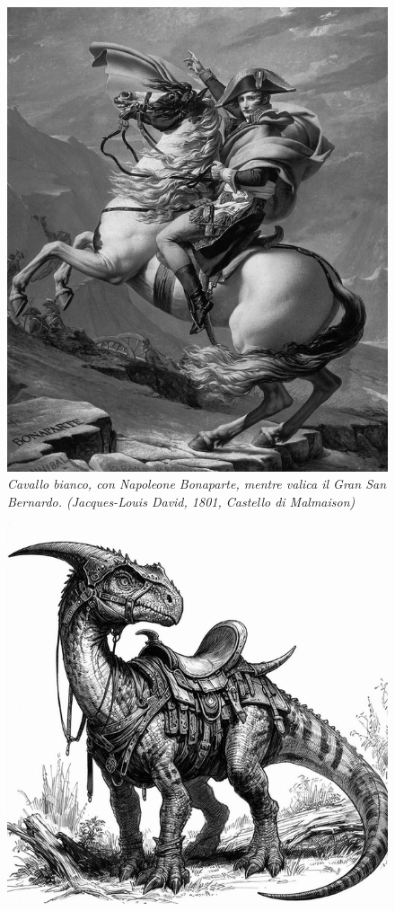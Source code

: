 \begin{figure}[h]
		\centering
	\begin{minipage}{0.45\textwidth}
		\centering
		\includegraphics[width=\textwidth]{immagini/napoleone.png}  %
\emph{Cavallo bianco, con Napoleone Bonaparte, mentre valica il Gran San Bernardo. (Jacques-Louis David, 1801, Castello di Malmaison)}
	\end{minipage}
	\hspace{0.5cm}
	\begin{minipage}{0.45\textwidth}
		\centering
		\includegraphics[width=\textwidth]{immagini/saurovallo1-ai.png} %

\end{minipage}
\end{figure}
